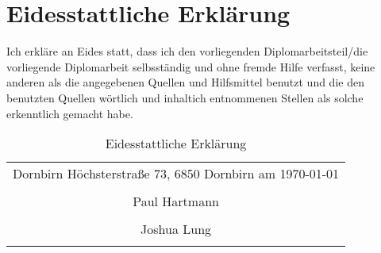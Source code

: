 \section*{Eidesstattliche Erklärung}

Ich erkläre an Eides statt, dass ich den vorliegenden Diplomarbeitsteil/die vorliegende Diplomarbeit selbsständig und ohne fremde Hilfe verfasst, keine anderen als die angegebenen Quellen und Hilfsmittel benutzt und die den benutzten Quellen wörtlich und inhaltich entnommenen Stellen als solche erkenntlich gemacht habe.

\begin{table}[H]
  \centering
  \begin{tabular}{c}
    \\
    Dornbirn Höchsterstraße 73, 6850 Dornbirn am \today \\
    \\ [10ex]

    \hline
    Paul Hartmann                                       \\
    \\ [10ex]

    \hline
    Joshua Lung                                         \\
    \\ [10ex]
  \end{tabular}
  \caption{Eidesstattliche Erklärung}
  \label{tab:eidesstaatliche_erklärung}
\end{table}